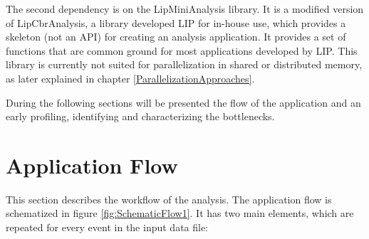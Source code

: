 The second dependency is on the LipMiniAnalysis library. It is a modified version of LipCbrAnalysis, a library developed LIP for in-house use, which provides a skeleton (not an API) for creating an analysis application. It provides a set of functions that are common ground for most applications developed by LIP. This library is currently not suited for parallelization in shared or distributed memory, as later explained in chapter \ref{ParallelizationApproaches}.

During the following sections will be presented the flow of the application and an early profiling, identifying and characterizing the bottlenecks.

\section{Application Flow}
\label{Application:Flow}

This section describes the workflow of the \tth analysis. The application flow is schematized in figure \ref{fig:SchematicFlow1}. It has two main elements, which are repeated for every event in the input data file: 

